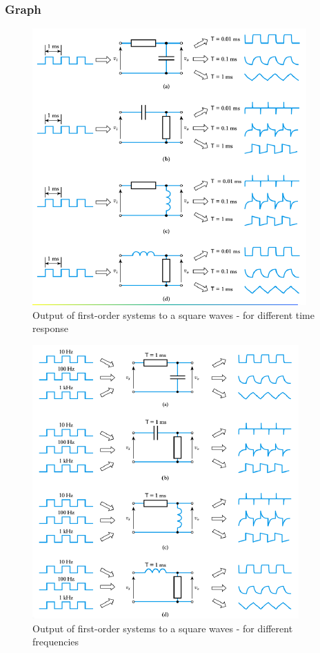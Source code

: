 \documentclass[UTF8]{article}
\begin{document}
\subsubsection{Graph}
\begin{figure}[H]
\centering
\includegraphics[scale=1.2]{c3.PNG}
\caption{Output of first-order systems to a square waves - for different time response}
\end{figure}
\begin{figure}[H]
\centering
\includegraphics[scale=1.2]{c4.PNG}
\caption{Output of first-order systems to a square waves - for different frequencies}
\end{figure}
\end{document}
